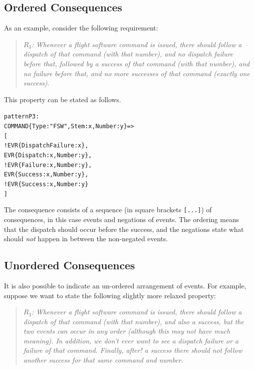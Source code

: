 \documentclass{report}
\newenvironment{code}[1] %
{
\vspace{0.5cm}
\begin{center}
\begin{Sbox}
\begin{minipage}{11cm}
\begin{alltt}
{\bf\em #1}
}
{
\end{alltt}
\end{minipage}
\end{Sbox}
\setlength{\fboxsep}{8pt}
\fbox{\TheSbox}
\end{center}
\vspace{0.5cm}
}
\begin{document}
\subsection{Ordered Consequences}

As an example, consider the following requirement:

\begin{quote}
	{\em $R_3$: Whenever a flight software command is issued, there should follow
	    a dispatch of that command (with that number), and no dispatch failure before that,
	    followed by a success of that command (with that number), and no failure before that,
	    and no more successes of that command (exactly one success).} 
\end{quote}

\noindent This property can be stated as follows.

\label{pattern:p3}

\begin{code}{}
pattern P3 :
  COMMAND\{Type: "FSW", Stem: x, Number: y\} => 
    [
      ! EVR\{DispatchFailure: x\},
        EVR\{Dispatch: x, Number: y\}, 
      ! EVR\{Failure : x, Number : y\},
        EVR\{Success: x, Number: y\},
      ! EVR\{Success: x, Number: y\}
    ]  
\end{code}

\noindent The consequence consists of a sequence (in square brackets {\tt [...]}) of consequences,
in this case events and negations of events. The ordering means that the dispatch should occur before the success,
and the negations state what should {\em not} happen in between the non-negated events.


\subsection{Unordered Consequences}

It is also possible to indicate an un-ordered arrangement of events. For example, suppose we want
to state the following slightly more relaxed property:

\begin{quote}
	{\em $R_3$: Whenever a flight software command is issued, there should follow
	    a dispatch of that command (with that number), and also a success, but the two
	        events can occur in any order (although this may not have much meaning). In addition,
	        we don't {\em ever} want to see a dispatch failure or a failure of that command. Finally,
	        after! a success there should not follow another success for that same command and number.}
\end{quote}
\end{document}
